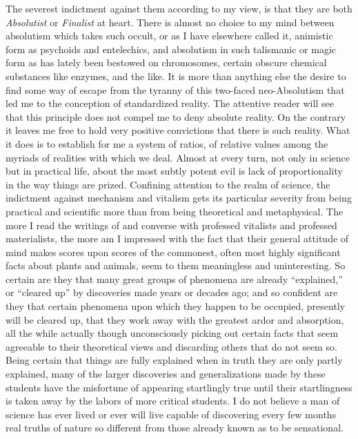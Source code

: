 \documentclass[a4paper, 11pt, oneside, polutonikogreek, english, landscape]{article}
\begin{document}
The severest indictment against them according to my view, is that they are both \emph{Absolutist} or \emph{Finalist} at heart. There is almost no choice to my mind between absolutism which takes such occult, or as I have elsewhere called it, animistic form as psychoids and entelechics, and absolutism in such talismanic or magic form as has lately been bestowed on chromosomes, certain obscure chemical substances like enzymes, and the like. It is more than anything else the desire to find some way of escape from the tyranny of this two-faced neo-Absolutism that led me to the conception of standardized reality. The attentive reader will see that this principle does not compel me to deny absolute reality. On the contrary it leaves me free to hold very positive convictions that there is such reality. What it does is to establish for me a system of ratios, of relative values among the myriads of realities with which we deal. Almost at every turn, not only in science but in practical life, about the most subtly potent evil is lack of proportionality in the way things are prized. Confining attention to the realm of science, the indictment against mechanism and vitalism gets its particular severity from being practical and scientific more than from being theoretical and metaphysical. The more I read the writings of and converse with professed vitalists and professed materialists, the more am I impressed with the fact that their general attitude of mind makes scores upon scores of the commonest, often most highly significant facts about plants and animals, seem to them meaningless and uninteresting. So certain are they that many great groups of phenomena are already ``explained,'' or ``cleared up'' by discoveries made years or decades ago; and so confident are they that certain phenomena upon which they happen to be occupied, presently will be cleared up, that they work away with the greatest ardor and absorption, all the while actually though unconsciously picking out certain facts that seem agreeable to their theoretical views and discarding others that do not seem so. Being certain that things are fully explained when in truth they are only partly explained, many of the larger discoveries and generalizations made by these students have the misfortune of appearing startlingly true until their startlingness is taken away by the labors of more critical students. I do not believe a man of science has ever lived or ever will live capable of discovering every few months real truths of nature so different from those already known as to be sensational.
\end{document}
